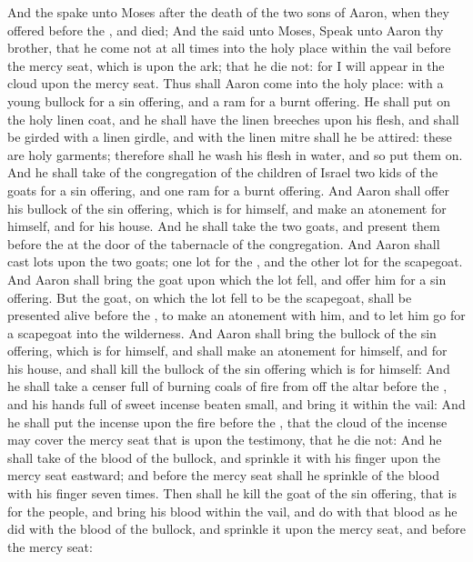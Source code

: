 \begin{biblechapter} %
 And the \LORD spake unto Moses after the death of the two sons of Aaron, when they offered before the \LORD, and died;
\verse And the \LORD said unto Moses, Speak unto Aaron thy brother, that he come not at all times into the holy place within the vail before the mercy seat, which is upon the ark; that he die not: for I will appear in the cloud upon the mercy seat.
\verse Thus shall Aaron come into the holy place: with a young bullock for a sin offering, and a ram for a burnt offering.
\verse He shall put on the holy linen coat, and he shall have the linen breeches upon his flesh, and shall be girded with a linen girdle, and with the linen mitre shall he be attired: these are holy garments; therefore shall he wash his flesh in water, and so put them on.
\verse And he shall take of the congregation of the children of Israel two kids of the goats for a sin offering, and one ram for a burnt offering.
\verse And Aaron shall offer his bullock of the sin offering, which is for himself, and make an atonement for himself, and for his house.
\verse And he shall take the two goats, and present them before the \LORD at the door of the tabernacle of the congregation.
\verse And Aaron shall cast lots upon the two goats; one lot for the \LORD, and the other lot for the scapegoat.
\verse And Aaron shall bring the goat upon which the \LORDs lot fell, and offer him for a sin offering.
\verse But the goat, on which the lot fell to be the scapegoat, shall be presented alive before the \LORD, to make an atonement with him, and to let him go for a scapegoat into the wilderness.
\verse And Aaron shall bring the bullock of the sin offering, which is for himself, and shall make an atonement for himself, and for his house, and shall kill the bullock of the sin offering which is for himself:
\verse And he shall take a censer full of burning coals of fire from off the altar before the \LORD, and his hands full of sweet incense beaten small, and bring it within the vail:
\verse And he shall put the incense upon the fire before the \LORD, that the cloud of the incense may cover the mercy seat that is upon the testimony, that he die not:
\verse And he shall take of the blood of the bullock, and sprinkle it with his finger upon the mercy seat eastward; and before the mercy seat shall he sprinkle of the blood with his finger seven times.
\verse Then shall he kill the goat of the sin offering, that is for the people, and bring his blood within the vail, and do with that blood as he did with the blood of the bullock, and sprinkle it upon the mercy seat, and before the mercy seat:

\end{biblechapter}
